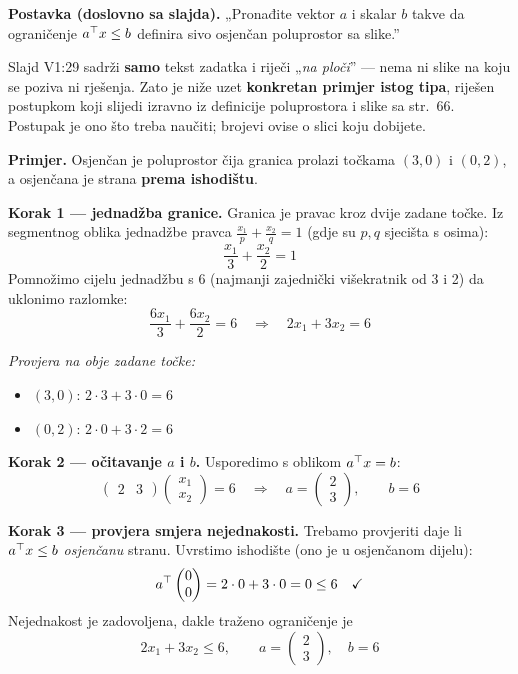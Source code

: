 \begin{zadatak}

\textbf{Postavka (doslovno sa slajda).} „Pronađite vektor $a$ i skalar $b$
takve da ograničenje $a^{\top} x \le b$ definira sivo osjenčan poluprostor sa
slike.”

\begin{napomena}
Slajd V1:29 sadrži \textbf{samo} tekst zadatka i riječi „\emph{na ploči}” ---
nema ni slike na koju se poziva ni rješenja. Zato je niže uzet
\textbf{konkretan primjer istog tipa}, riješen postupkom koji slijedi izravno
iz definicije poluprostora  i slike sa str.\ 66. Postupak je ono što
treba naučiti; brojevi ovise o slici koju dobijete.
\end{napomena}

\textbf{Primjer.} Osjenčan je poluprostor čija granica prolazi točkama
$(3, 0)$ i $(0, 2)$, a osjenčana je strana \textbf{prema ishodištu}.

\textbf{Korak 1 --- jednadžba granice.} Granica je pravac kroz dvije zadane
točke. Iz segmentnog oblika jednadžbe pravca
$\frac{x_1}{p} + \frac{x_2}{q} = 1$ (gdje su $p, q$ sjecišta s osima):
\[
\frac{x_1}{3} + \frac{x_2}{2} = 1
\]
Pomnožimo cijelu jednadžbu s $6$ (najmanji zajednički višekratnik od 3 i 2) da
uklonimo razlomke:
\[
\frac{6x_1}{3} + \frac{6x_2}{2} = 6
\quad\Longrightarrow\quad
2x_1 + 3x_2 = 6
\]

\emph{Provjera na obje zadane točke:}
\begin{itemize}
  \item $(3,0)$: $2\cdot3 + 3\cdot0 = 6$ \checkmark
  \item $(0,2)$: $2\cdot0 + 3\cdot2 = 6$ \checkmark
\end{itemize}

\textbf{Korak 2 --- očitavanje $a$ i $b$.} Usporedimo s oblikom
$a^{\top} x = b$:
\[
\begin{pmatrix} 2 & 3\end{pmatrix}
\begin{pmatrix} x_1 \\ x_2\end{pmatrix} = 6
\quad\Longrightarrow\quad
a = \begin{pmatrix} 2 \\ 3\end{pmatrix}, \qquad b = 6
\]

\textbf{Korak 3 --- provjera smjera nejednakosti.} Trebamo provjeriti daje li
$a^{\top} x \le b$ \emph{osjenčanu} stranu. Uvrstimo ishodište (ono je u osjenčanom
dijelu):
\[
a^{\top} \begin{pmatrix}0\\0\end{pmatrix} = 2\cdot 0 + 3\cdot 0 = 0 \le 6
\quad\checkmark
\]
Nejednakost je zadovoljena, dakle traženo ograničenje je
\[
\boxed{\;2x_1 + 3x_2 \le 6, \qquad
a = \begin{pmatrix}2\\3\end{pmatrix}, \quad b = 6\;}
\]


\end{zadatak}
